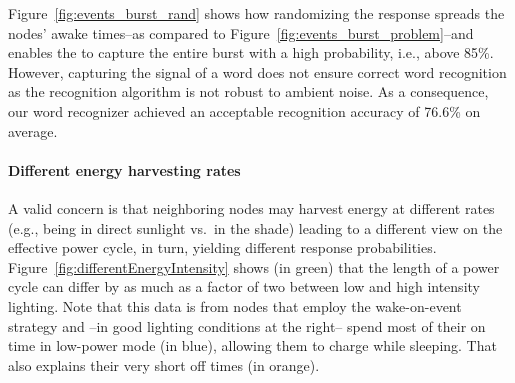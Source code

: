Figure~\ref{fig:events_burst_rand} shows how randomizing the \cis response spreads the nodes' awake times--as compared to Figure~\ref{fig:events_burst_problem}--and enables the \cis to capture the entire burst with a high probability, i.e., above 85\%. 
However, capturing the signal of a word does not ensure correct word
recognition as the recognition algorithm is not robust to ambient noise.
As a consequence, our word recognizer achieved an acceptable recognition
accuracy of 76.6\% on average.






\paragraph{Different energy harvesting rates}
A valid concern is that neighboring nodes may harvest energy at different
rates (e.g., being in direct sunlight vs.\ in the shade) leading to a different
view on the effective power cycle, in turn, yielding different response
probabilities. Figure~\ref{fig:differentEnergyIntensity} shows (in green)
that the length of a power cycle can differ by as much as a factor of two
between low and high intensity lighting. Note that this data is from nodes that
employ the wake-on-event strategy and --in good lighting conditions at the
right-- spend most of their on time in low-power mode (in blue), allowing
them to charge while sleeping. That also explains their very short off times
(in orange).

